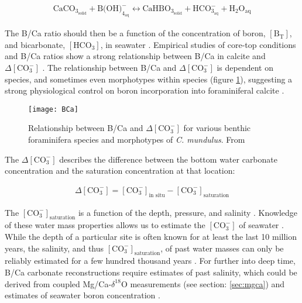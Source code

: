 \begin{align}
\text{CaCO}_{3_{\text{solid}}} + \text{B(OH)}^{-}_{4_{\text{aq}}} \leftrightarrow \text{CaHBO}_{3_{\text{solid}}} + \text{HCO}^{-}_{3_{\text{aq}}} + \text{H}_{2}\text{O}_{\text{aq}}
\end{align}

The B/Ca ratio should then be a function of the concentration of boron, $\left[\text{B}_{\text{T}}\right]$, and bicarbonate, $\left[\text{HCO}_{3}\right]$, in seawater \citep{yuBenthicForaminiferalCa2007}. Empirical studies of core-top conditions and B/Ca ratios show a strong relationship between B/Ca in calcite and $\Delta\left[ \text{CO}_{3}^{-} \right]$ \citep{yuBenthicForaminiferalCa2007, raeBoronIsotopesCa2011}. The relationship between B/Ca and $\Delta\left[ \text{CO}_{3}^{-} \right]$ is dependent on species, and sometimes even morphotypes within species (figure \ref{BCa}), suggesting a strong physiological control on boron incorporation into foraminiferal calcite \citep{raeBoronIsotopesCa2011}.

\begin{figure}[h]
	\texttt{[image: BCa]}
	\centering
	\caption{Relationship between B/Ca and $\Delta\left[ \text{CO}_{3}^{-} \right]$ for various benthic foraminifera species and morphotypes of \emph{C. mundulus}. From \citet{raeBoronIsotopesCa2011}}
	\label{BCa}
\end{figure}

The $\Delta\left[ \text{CO}_{3}^{-} \right]$ describes the difference between the bottom water carbonate concentration and the saturation concentration at that location:

\begin{align}
\Delta\left[ \text{CO}_{3}^{-} \right] = \left[ \text{CO}_{3}^{-} \right]_{\text{in situ}} - \left[ \text{CO}_{3}^{-} \right]_{\text{saturation}}
\end{align}

The $\left[ \text{CO}_{3}^{-} \right]_{\text{saturation}}$ is a function of the depth, pressure, and salinity \citep{lynch-stieglitz16TracersOcean2004}. Knowledge of these water mass properties allows us to estimate the $\left[ \text{CO}_{3}^{-} \right]$ of seawater \citep{yuBenthicForaminiferalCa2007}. While the depth of a particular site is often known for at least the last 10 million years, the salinity, and thus $\left[ \text{CO}_{3}^{-} \right]_{\text{saturation}}$, of past water masses can only be reliably estimated for a few hundred thousand years \citep{honischBoronProxiesPaleoceanography2019}. For further into deep time, B/Ca carbonate reconstructions require estimates of past salinity, which could be derived from coupled Mg/Ca-$\delta^{18}$O measurements (see section: \ref{sec:mgca}) and estimates of seawater boron concentration \citep{tripatiCouplingCO2Ice2009}.

